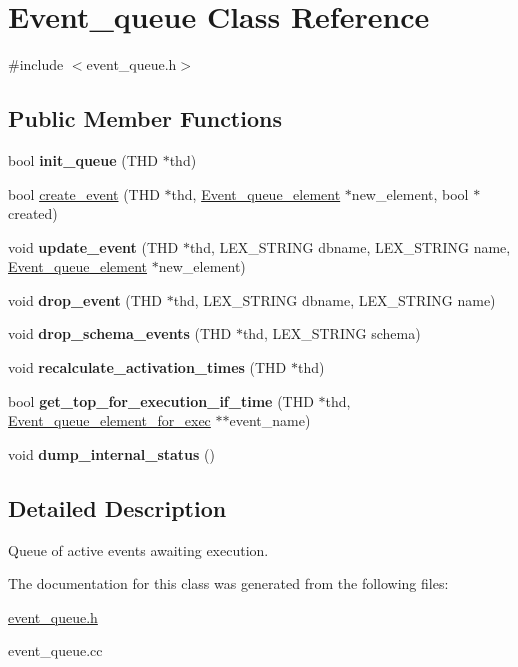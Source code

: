 \hypertarget{classEvent__queue}{}\section{Event\+\_\+queue Class Reference}
\label{classEvent__queue}


{\ttfamily \#include $<$event\+\_\+queue.\+h$>$}

\subsection*{Public Member Functions}
\begin{DoxyCompactItemize}
\item 
bool {\bfseries init\+\_\+queue} (T\+HD $\ast$thd)
\item 
bool \mbox{\hyperlink{group__Event__Scheduler_gad864f1ee71bf785ce02a4f6cc3273fc4}{create\+\_\+event}} (T\+HD $\ast$thd, \mbox{\hyperlink{classEvent__queue__element}{Event\+\_\+queue\+\_\+element}} $\ast$new\+\_\+element, bool $\ast$created)
\item 
void {\bfseries update\+\_\+event} (T\+HD $\ast$thd, L\+E\+X\+\_\+\+S\+T\+R\+I\+NG dbname, L\+E\+X\+\_\+\+S\+T\+R\+I\+NG name, \mbox{\hyperlink{classEvent__queue__element}{Event\+\_\+queue\+\_\+element}} $\ast$new\+\_\+element)
\item 
void {\bfseries drop\+\_\+event} (T\+HD $\ast$thd, L\+E\+X\+\_\+\+S\+T\+R\+I\+NG dbname, L\+E\+X\+\_\+\+S\+T\+R\+I\+NG name)
\item 
void {\bfseries drop\+\_\+schema\+\_\+events} (T\+HD $\ast$thd, L\+E\+X\+\_\+\+S\+T\+R\+I\+NG schema)
\item 
void {\bfseries recalculate\+\_\+activation\+\_\+times} (T\+HD $\ast$thd)
\item 
bool {\bfseries get\+\_\+top\+\_\+for\+\_\+execution\+\_\+if\+\_\+time} (T\+HD $\ast$thd, \mbox{\hyperlink{classEvent__queue__element__for__exec}{Event\+\_\+queue\+\_\+element\+\_\+for\+\_\+exec}} $\ast$$\ast$event\+\_\+name)
\item 
void {\bfseries dump\+\_\+internal\+\_\+status} ()
\end{DoxyCompactItemize}


\subsection{Detailed Description}
Queue of active events awaiting execution. 

The documentation for this class was generated from the following files\+:\begin{DoxyCompactItemize}
\item 
\mbox{\hyperlink{event__queue_8h}{event\+\_\+queue.\+h}}\item 
event\+\_\+queue.\+cc\end{DoxyCompactItemize}
